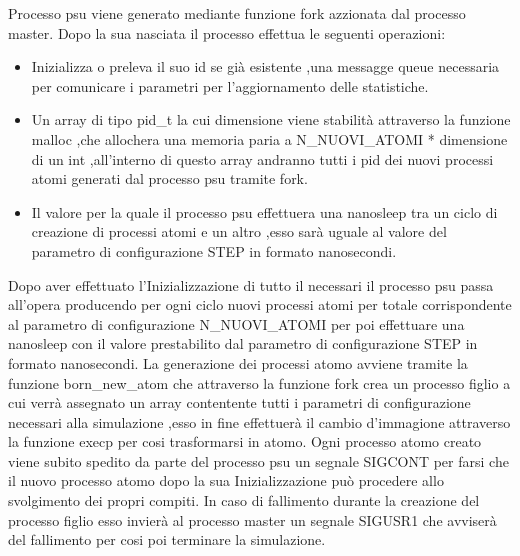 Processo psu viene generato mediante funzione fork azzionata dal processo master.
Dopo la sua nasciata il processo effettua le seguenti operazioni:
\begin{itemize}
    \item Inizializza o preleva il suo id se già esistente ,una messagge queue necessaria per comunicare i parametri per l'aggiornamento delle statistiche. 
    \item Un array di tipo pid\_t la cui dimensione viene stabilità attraverso la funzione malloc ,che allochera una memoria paria a N\_NUOVI\_ATOMI * dimensione di un int ,all'interno di questo array andranno tutti i pid dei nuovi processi atomi generati dal processo psu tramite fork. 
    \item Il valore per la quale il processo psu effettuera una nanosleep tra un ciclo di creazione di processi atomi e un altro ,esso sarà uguale al valore del parametro di configurazione STEP in formato nanosecondi.
\end{itemize}
Dopo aver effettuato l'Inizializzazione di tutto il necessari il processo psu passa all'opera producendo per ogni ciclo nuovi processi atomi per totale corrispondente al parametro di configurazione N\_NUOVI\_ATOMI per poi effettuare una nanosleep con il valore prestabilito dal parametro di configurazione STEP in formato nanosecondi.
La generazione dei processi atomo avviene tramite la funzione born\_new\_atom che attraverso la funzione fork crea un processo figlio a cui verrà assegnato un array contentente tutti i parametri di configurazione necessari alla simulazione ,esso in fine effettuerà il cambio d'immagione attraverso la funzione execp per cosi trasformarsi in atomo.
Ogni processo atomo creato viene subito spedito da parte del processo psu un segnale SIGCONT per farsi che il nuovo processo atomo dopo la sua Inizializzazione può procedere allo svolgimento dei propri compiti. 
In caso di fallimento durante la creazione del processo figlio esso invierà al processo master un segnale SIGUSR1 che avviserà del fallimento per cosi poi terminare la simulazione. 
